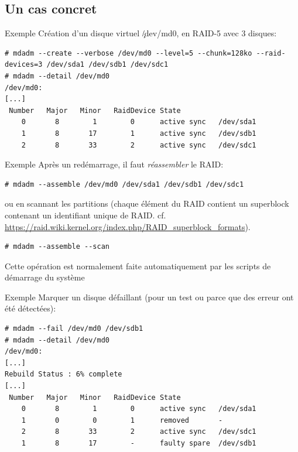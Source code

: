 \subsection{Un cas concret}

\begin{frame}[fragile=singleslide]{Exemple}
  Création d'un disque virtuel \c{/dev/md0}, en RAID-5 avec 3 disques:
  \begin{lstlisting}
# mdadm --create --verbose /dev/md0 --level=5 --chunk=128ko --raid-devices=3 /dev/sda1 /dev/sdb1 /dev/sdc1
# mdadm --detail /dev/md0
/dev/md0:
[...]
 Number   Major   Minor   RaidDevice State
    0       8        1        0      active sync   /dev/sda1
    1       8       17        1      active sync   /dev/sdb1
    2       8       33        2      active sync   /dev/sdc1
  \end{lstlisting}
\end{frame}

\begin{frame}[fragile=singleslide]{Exemple}
  Après un redémarrage, il faut \emph{réassembler} le RAID:
  \begin{lstlisting}
# mdadm --assemble /dev/md0 /dev/sda1 /dev/sdb1 /dev/sdc1
  \end{lstlisting}
  ou  en scannant  les partitions  (chaque élément  du RAID  contient un
  superblock      contenant     un      identifiant      unique     de
  RAID. cf. \url{https://raid.wiki.kernel.org/index.php/RAID_superblock_formats}).
  \begin{lstlisting}
# mdadm --assemble --scan
  \end{lstlisting}
  Cette  opération  est  normalement  faite  automatiquement  par  les
  scripts de démarrage du système
\end{frame}

\begin{frame}[fragile=singleslide]{Exemple}
  Marquer un disque  défaillant (pour un test ou  parce que des erreur
  ont été détectées):
  \begin{lstlisting}
# mdadm --fail /dev/md0 /dev/sdb1
# mdadm --detail /dev/md0
/dev/md0:
[...]
Rebuild Status : 6% complete
[...]
 Number   Major   Minor   RaidDevice State
    0       8        1        0      active sync   /dev/sda1
    1       0        0        1      removed       -
    2       8       33        2      active sync   /dev/sdc1
    1       8       17        -      faulty spare  /dev/sdb1
  \end{lstlisting}
\end{frame}

